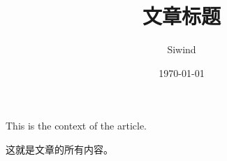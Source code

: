 \documentclass[UTF8]{ctexart}
\title{文章标题}
\author{Siwind}
\date{\today}
\begin{document}
\maketitle


This is the context of the article.


这就是文章的所有内容。

 
\end{document}
